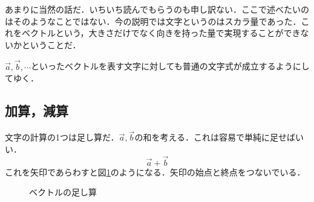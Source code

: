     あまりに当然の話だ．いちいち読んでもらうのも申し訳ない．ここで述べたいのはそのようなことではない．今の説明では文字というのはスカラ量であった．これをベクトルという，大きさだけでなく向きを持った量で実現することができないかということだ．

    $\vec{a},\vec{b},\cdots$といったベクトルを表す文字に対しても普通の文字式が成立するようにしてゆく．

    \subsection{加算，減算}
    文字の計算の1つは足し算だ．$\vec{a},\vec{b}$の和を考える．これは容易で単純に足せばいい．
    \[
    \vec{a}+\vec{b}
    \]
    これを矢印であらわすと図\ref{fig:vector_tasizan}のようになる．矢印の始点と終点をつないでいる．
    \begin{figure}[htbp]
        \begin{center}
        \end{center}
        \caption{ベクトルの足し算}
        \label{fig:vector_tasizan}
    \end{figure}

